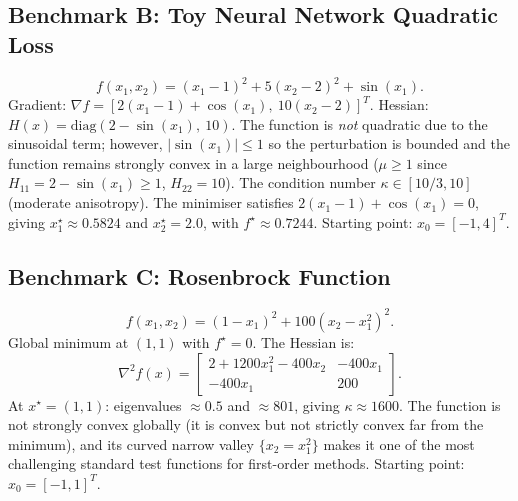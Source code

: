\documentclass[11pt,a4paper]{article}
\theoremstyle{definition}
\begin{document}
\subsection{Benchmark B: Toy Neural Network Quadratic Loss}
\begin{equation}
f(x_1, x_2) = (x_1 - 1)^2 + 5(x_2 - 2)^2 + \sin(x_1).
\label{eq:bench_B}
\end{equation}
Gradient: $\nabla f = [2(x_1 - 1) + \cos(x_1),\ 10(x_2 - 2)]^T$. Hessian: $H(x) = \text{diag}(2 - \sin(x_1),\ 10)$. The function is \emph{not} quadratic due to the sinusoidal term; however, $|\sin(x_1)| \leq 1$ so the perturbation is bounded and the function remains strongly convex in a large neighbourhood ($\mu \geq 1$ since $H_{11} = 2 - \sin(x_1) \geq 1$, $H_{22} = 10$). The condition number $\kappa \in [10/3, 10]$ (moderate anisotropy). The minimiser satisfies $2(x_1-1) + \cos(x_1) = 0$, giving $x_1^{\star} \approx 0.5824$ and $x_2^{\star} = 2.0$, with $f^{\star} \approx 0.7244$. Starting point: $x_0 = [-1, 4]^T$.

\subsection{Benchmark C: Rosenbrock Function}
\begin{equation}
f(x_1, x_2) = (1 - x_1)^2 + 100(x_2 - x_1^2)^2.
\label{eq:rosenbrock}
\end{equation}
Global minimum at $(1,1)$ with $f^{\star} = 0$. The Hessian is:
\begin{equation}
\nabla^2 f(x) = \begin{bmatrix} 2 + 1200x_1^2 - 400x_2 & -400x_1 \\ -400x_1 & 200 \end{bmatrix}.
\end{equation}
At $x^{\star} = (1,1)$: eigenvalues $\approx 0.5$ and $\approx 801$, giving $\kappa \approx 1600$. The function is not strongly convex globally (it is convex but not strictly convex far from the minimum), and its curved narrow valley $\{x_2 = x_1^2\}$ makes it one of the most challenging standard test functions for first-order methods. Starting point: $x_0 = [-1, 1]^T$.
\end{document}

